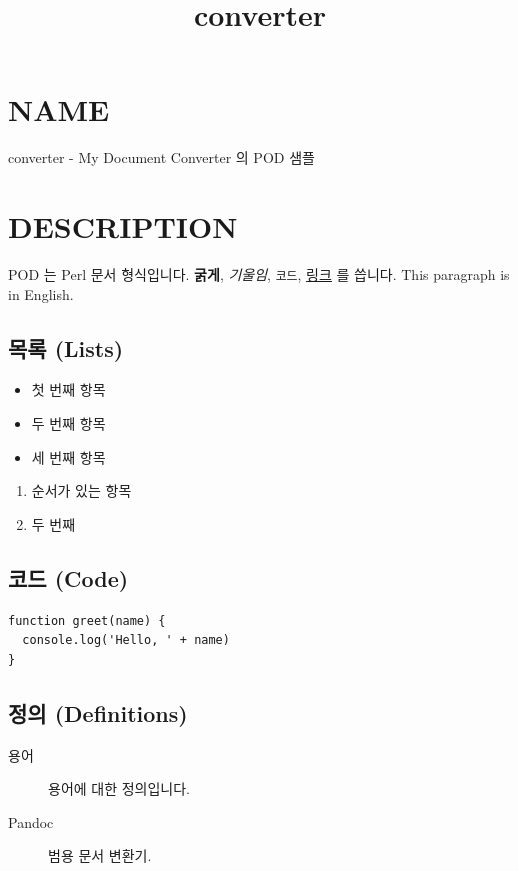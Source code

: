 \documentclass[11pt]{article}
\title{converter}
\date{}
\begin{document}
\maketitle

\section*{NAME}\label{name}

converter - My Document Converter 의 POD 샘플

\section*{DESCRIPTION}\label{description}

POD 는 Perl 문서 형식입니다. \textbf{굵게}, \emph{기울임}, \verb|코드|,
\href{https://example.com}{링크} 를 씁니다.
This paragraph is in English.

\subsection*{목록 (Lists)}\label{목록-lists}

\begin{itemize}
\item 첫 번째 항목
\item 두 번째 항목
\item 세 번째 항목
\end{itemize}

\begin{enumerate}
\item 순서가 있는 항목
\item 두 번째
\end{enumerate}

\subsection*{코드 (Code)}\label{코드-code}

\begin{verbatim}
function greet(name) {
  console.log('Hello, ' + name)
}
\end{verbatim}

\subsection*{정의 (Definitions)}\label{정의-definitions}

\begin{description}
\item[용어] 용어에 대한 정의입니다.
\item[Pandoc] 범용 문서 변환기.
\end{description}
\end{document}

